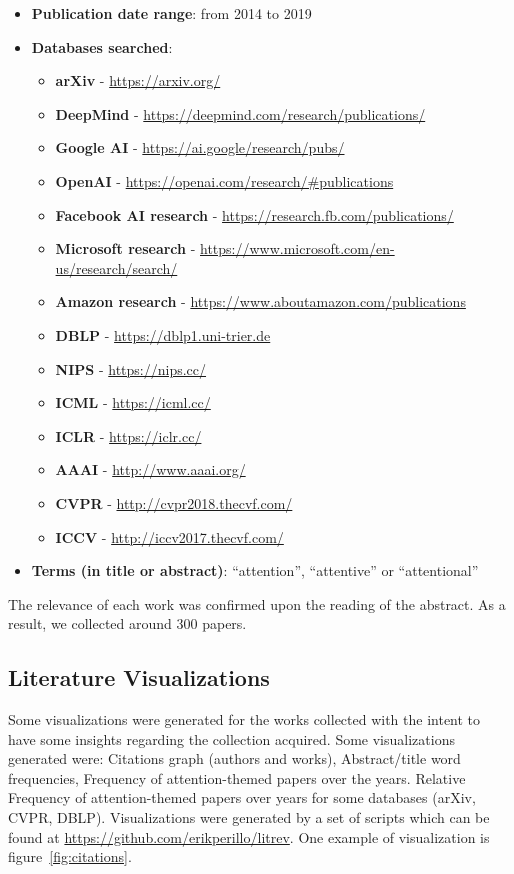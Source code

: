 \documentclass[12pt]{article}
\begin{document}
\begin{itemize}
    \item \textbf{Publication date range}: from 2014 to 2019
    \item \textbf{Databases searched}:
    \begin{itemize}
        \item \textbf{arXiv} - \url{https://arxiv.org/}
        \item \textbf{DeepMind} - \url{https://deepmind.com/research/publications/}
        \item \textbf{Google AI} - \url{https://ai.google/research/pubs/}
        \item \textbf{OpenAI} - \url{https://openai.com/research/#publications}
        \item \textbf{Facebook AI research} - \url{https://research.fb.com/publications/}
        \item \textbf{Microsoft research} - \url{https://www.microsoft.com/en-us/research/search/}
        \item \textbf{Amazon research} - \url{https://www.aboutamazon.com/publications}
        \item \textbf{DBLP} - \url{https://dblp1.uni-trier.de}
        \item \textbf{NIPS} - \url{https://nips.cc/}
        \item \textbf{ICML} - \url{https://icml.cc/}
        \item \textbf{ICLR} - \url{https://iclr.cc/}
        \item \textbf{AAAI} - \url{http://www.aaai.org/}
        \item \textbf{CVPR} - \url{http://cvpr2018.thecvf.com/}
        \item \textbf{ICCV} - \url{http://iccv2017.thecvf.com/}
    \end{itemize}
    \item \textbf{Terms (in title or abstract)}: ``attention'',
        ``attentive'' or ``attentional''
\end{itemize}

The relevance of each work was confirmed upon the reading of the abstract.
As a result, we collected around 300 papers.

\subsection{Literature Visualizations}
Some visualizations were generated for the works collected with the intent
to have some insights regarding the collection acquired.
Some visualizations generated were: Citations graph (authors and works),
Abstract/title word frequencies, Frequency of attention-themed papers over the years. Relative Frequency of attention-themed papers over years for some databases (arXiv, CVPR, DBLP).
Visualizations were generated by a set of scripts which can be found at \url{https://github.com/erikperillo/litrev}.
One example of visualization is figure~\ref{fig:citations}.
\end{document}
